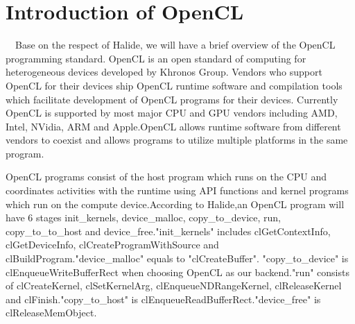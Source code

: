 \section{Introduction of OpenCL}
\quad\  \ Base on the respect of Halide, we will have a brief overview of the OpenCL programming standard. OpenCL is an open standard of computing for heterogeneous devices developed by Khronos Group. Vendors who support OpenCL for their devices ship OpenCL runtime software and compilation tools which facilitate development of OpenCL programs for their devices. Currently OpenCL is supported by most major CPU and GPU vendors including AMD, Intel, NVidia, ARM and Apple.OpenCL allows runtime software from different vendors to coexist and allows programs to utilize multiple platforms in the same program. 

OpenCL programs consist of the host program which runs on the CPU and coordinates activities with the runtime using API functions and kernel programs which run on the compute device.According to Halide,an OpenCL program will have 6 stages init\_kernels,  device\_malloc, copy\_to\_device, run,  copy\_to\_to\_host and device\_free."init\_kernels" includes clGetContextInfo, clGetDeviceInfo, clCreateProgramWithSource and clBuildProgram."device\_malloc" equals to "clCreateBuffer". "copy\_to\_device" is clEnqueueWriteBufferRect when choosing OpenCL as our backend."run" consists of clCreateKernel, clSetKernelArg, clEnqueueNDRangeKernel, clReleaseKernel and clFinish."copy\_to\_host" is clEnqueueReadBufferRect."device\_free" is clReleaseMemObject.

